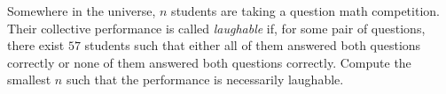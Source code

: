 Somewhere in the universe, $n$ students are taking a question math competition.  Their collective performance is called \textit{laughable} if, for some pair of questions, there exist $57$ students such that either all of them answered both questions correctly or none of them answered both questions correctly.  Compute the smallest $n$ such that the performance is necessarily laughable.